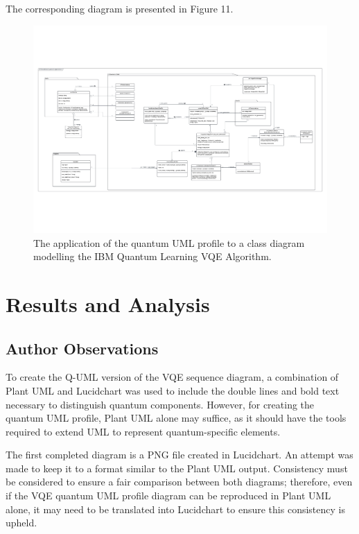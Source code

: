 \documentclass{article}
\begin{document}
The corresponding diagram is presented in Figure 11.

\begin{figure}
    \centering
    \includegraphics[width=1\linewidth]{VQE UML Profile CD Final Version.pdf}
    \caption{The application of the quantum UML profile to a class diagram modelling the IBM Quantum Learning VQE Algorithm.}
    \label{fig:QUMLP_CD}
\end{figure}

\section{Results and Analysis}

\subsection{Author Observations}

To create the Q-UML version of the VQE sequence diagram, a combination of Plant UML and Lucidchart was used to include the double lines and bold text necessary to distinguish quantum components. However, for creating the quantum UML profile, Plant UML alone may suffice, as it should have the tools required to extend UML to represent quantum-specific elements. 

The first completed diagram is a PNG file created in Lucidchart. An attempt was made to keep it to a format similar to the Plant UML output. Consistency must be considered to ensure a fair comparison between both diagrams; therefore, even if the VQE quantum UML profile diagram can be reproduced in Plant UML alone, it may need to be translated into Lucidchart to ensure this consistency is upheld.
\end{document}
